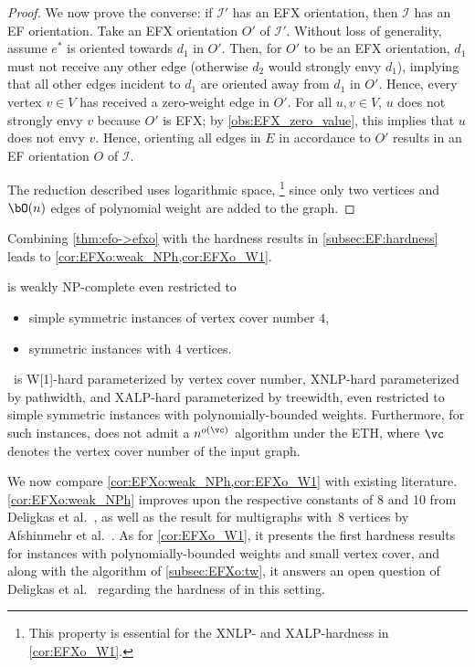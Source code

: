 \documentclass[11pt,letterpaper]{article}
\begin{document}
\begin{proof}
    We now prove the converse: if $\mathcal{I}'$ has an EFX orientation, then $\mathcal{I}$ has an EF orientation. Take an EFX orientation $O'$ of $\mathcal{I}'$. Without loss of generality, assume $e^*$ is oriented towards $d_1$ in $O'$. Then, for $O'$ to be an EFX orientation, $d_1$ must not receive any other edge (otherwise $d_2$ would strongly envy $d_1$), implying that all other edges incident to $d_1$ are oriented away from $d_1$ in $O'$. Hence, every vertex $v\in V$ has received a zero-weight edge in $O'$. For all $u,v\in V$, $u$ does not strongly envy $v$ because $O'$ is EFX; by \cref{obs:EFX_zero_value}, this implies that $u$ does not envy $v$. Hence, orienting all edges in $E$ in accordance to $O'$ results in an EF orientation $O$ of $\mathcal{I}$.

    The reduction described uses logarithmic space,%
    \footnote{This property is essential for the XNLP- and XALP-hardness in \cref{cor:EFXo_W1}.}
    since only two vertices and $\bO(n)$ edges of polynomial weight are added to the graph.
\end{proof}

Combining \cref{thm:efo->efxo} with the hardness results in \cref{subsec:EF:hardness} leads to \cref{cor:EFXo:weak_NPh,cor:EFXo_W1}.

\begin{corollary}\label{cor:EFXo:weak_NPh}
    {\EFXo} is weakly NP-complete even restricted to
    \begin{itemize}
        \item simple symmetric instances of vertex cover number $4$,
        \item symmetric instances with $4$ vertices.
    \end{itemize}
\end{corollary}

\begin{corollary}\label{cor:EFXo_W1}
    \EFXo\ is  W[1]-hard parameterized by vertex cover number,
    XNLP-hard parameterized by pathwidth,
    and XALP-hard parameterized by treewidth,
    even restricted to simple symmetric instances with polynomially-bounded weights.
    Furthermore, for such instances, {\EFXo} does not admit a $n^{o(\vc)}$ algorithm under the ETH,
    where $\vc$ denotes the vertex cover number of the input graph.
\end{corollary}

We now compare \cref{cor:EFXo:weak_NPh,cor:EFXo_W1} with existing literature.
\cref{cor:EFXo:weak_NPh} improves upon the respective constants of 8 and 10 from Deligkas et al.~\cite{ijcai/DeligkasEGK25}, as well as the result for multigraphs with~8 vertices by Afshinmehr et al.~\cite{AfshinmehrDKMR25}.
As for \cref{cor:EFXo_W1}, it presents the first hardness results for instances with polynomially-bounded weights and small vertex cover,
and along with the algorithm of \cref{subsec:EFXo:tw}, it answers an open question of Deligkas et al.~\cite{ijcai/DeligkasEGK25} regarding the hardness of {\EFXo} in this setting.
\end{document}
